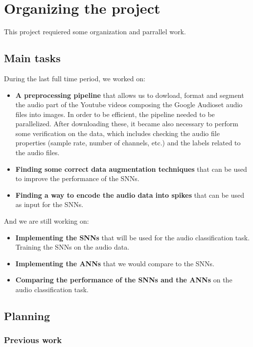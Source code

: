 \documentclass[11pt]{article}
\begin{document}
\pagebreak

\section{Organizing the project}
This project requiered some organization and parrallel work.

\subsection{Main tasks}

During the last full time period, we worked on: 

\begin{itemize}
  \item \textbf{A preprocessing pipeline} that allows us to dowload, format and segment the audio part of the Youtube videos composing the Google Audioset audio files into images.
  In order to be efficient, the pipeline needed to be parallelized.
  \subitem After downloading these, it became also necessary to perform some verification on the data, which includes checking the audio file properties (sample rate, number of channels, etc.) and the labels related to the audio files.
  \item \textbf{Finding some correct data augmentation techniques} that can be used to improve the performance of the SNNs.
  \item \textbf{Finding a way to encode the audio data into spikes} that can be used as input for the SNNs.
\end{itemize}

And we are still working on:

\begin{itemize}
  \item \textbf{Implementing the SNNs} that will be used for the audio classification task.
  \subitem Training the SNNs on the audio data.
  \item \textbf{Implementing the ANNs} that we would compare to the SNNs.
  \item \textbf{Comparing the performance of the SNNs and the ANNs} on the audio classification task.
\end{itemize}


\subsection{Planning}

\subsubsection{Previous work}
\end{document}
